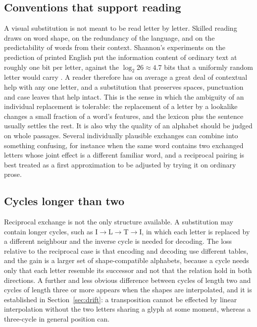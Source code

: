 \subsection{Conventions that support reading}

A visual substitution is not meant to be read letter by letter. Skilled reading draws on word shape, on the redundancy of the language, and on the predictability of words from their context. Shannon's experiments on the prediction of printed English put the information content of ordinary text at roughly one bit per letter, against the $\log_2 26\approx4.7$ bits that a uniformly random letter would carry \citep{shannon1951}. A reader therefore has on average a great deal of contextual help with any one letter, and a substitution that preserves spaces, punctuation and case leaves that help intact. This is the sense in which the ambiguity of an individual replacement is tolerable: the replacement of a letter by a lookalike changes a small fraction of a word's features, and the lexicon plus the sentence usually settles the rest. It is also why the quality of an alphabet should be judged on whole passages. Several individually plausible exchanges can combine into something confusing, for instance when the same word contains two exchanged letters whose joint effect is a different familiar word, and a reciprocal pairing is best treated as a first approximation to be adjusted by trying it on ordinary prose.

\subsection{Cycles longer than two}

Reciprocal exchange is not the only structure available. A substitution may contain longer cycles, such as I$\to$L$\to$T$\to$I, in which each letter is replaced by a different neighbour and the inverse cycle is needed for decoding. The loss relative to the reciprocal case is that encoding and decoding use different tables, and the gain is a larger set of shape-compatible alphabets, because a cycle needs only that each letter resemble its successor and not that the relation hold in both directions. A further and less obvious difference between cycles of length two and cycles of length three or more appears when the shapes are interpolated, and it is established in Section~\ref{sec:drift}: a transposition cannot be effected by linear interpolation without the two letters sharing a glyph at some moment, whereas a three-cycle in general position can.
